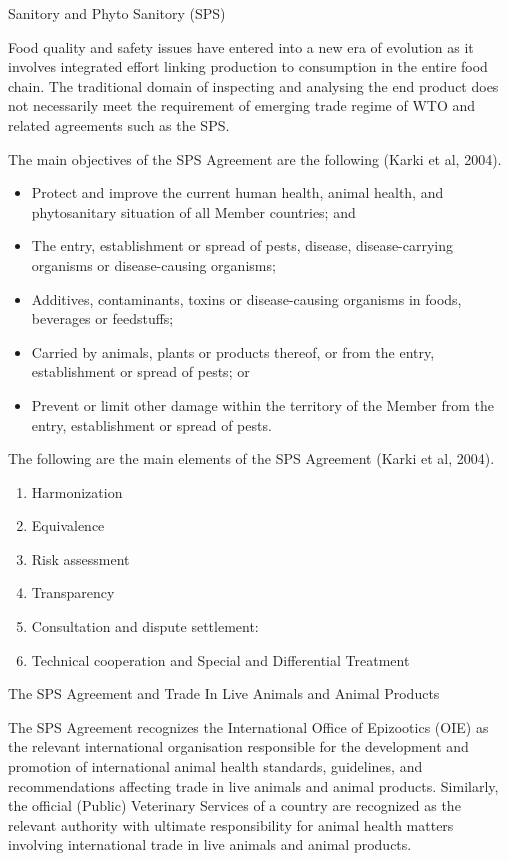 \documentclass[
  openany]{book}
\providecommand{\tightlist}{%
  \setlength{\itemsep}{0pt}\setlength{\parskip}{0pt}}
\begin{document}
Sanitory and Phyto Sanitory (SPS)

Food quality and safety issues have entered into a new era of evolution as it involves integrated effort linking production to consumption in the entire food chain. The traditional domain of inspecting and analysing the end product does not necessarily meet the requirement of emerging trade regime of WTO and related agreements such as the SPS.

The main objectives of the SPS Agreement are the following (Karki et al, 2004).

\begin{itemize}
\tightlist
\item
  Protect and improve the current human health, animal health, and phytosanitary situation of all Member countries; and
\item
  The entry, establishment or spread of pests, disease, disease-carrying organisms or disease-causing organisms;
\item
  Additives, contaminants, toxins or disease-causing organisms in foods, beverages or feedstuffs;
\item
  Carried by animals, plants or products thereof, or from the entry, establishment or spread of pests; or
\item
  Prevent or limit other damage within the territory of the Member from the entry, establishment or spread of pests.
\end{itemize}

The following are the main elements of the SPS Agreement (Karki et al, 2004).

\begin{enumerate}
\def\labelenumi{\arabic{enumi}.}
\tightlist
\item
  Harmonization
\item
  Equivalence
\item
  Risk assessment
\item
  Transparency
\item
  Consultation and dispute settlement:
\item
  Technical cooperation and Special and Differential Treatment
\end{enumerate}

The SPS Agreement and Trade In Live Animals and Animal Products

The SPS Agreement recognizes the International Office of Epizootics (OIE) as the relevant international organisation responsible for the development and promotion of international animal health standards, guidelines, and recommendations affecting trade in live animals and animal products. Similarly, the official (Public) Veterinary Services of a country are recognized as the relevant authority with ultimate responsibility for animal health matters involving international trade in live animals and animal products.
\end{document}
